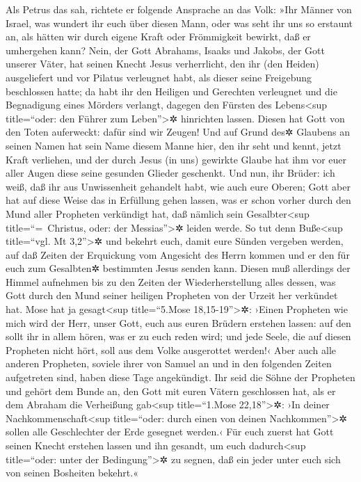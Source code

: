  Als Petrus das sah, richtete er folgende Ansprache an
das Volk: »Ihr Männer von Israel, was wundert ihr euch über diesen Mann,
oder was seht ihr uns so erstaunt an, als hätten wir durch eigene Kraft
oder Frömmigkeit bewirkt, daß er umhergehen kann?  Nein,
der Gott Abrahams, Isaaks und Jakobs, der Gott unserer Väter, hat seinen
Knecht Jesus verherrlicht, den ihr (den Heiden) ausgeliefert und vor
Pilatus verleugnet habt, als dieser seine Freigebung beschlossen hatte;
 da habt ihr den Heiligen und Gerechten verleugnet und
die Begnadigung eines Mörders verlangt,  dagegen den
Fürsten des Lebens\textless sup title=``oder: den Führer zum
Leben''\textgreater✲ hinrichten lassen. Diesen hat Gott von den Toten
auferweckt: dafür sind wir Zeugen!  Und auf Grund des✲
Glaubens an seinen Namen hat sein Name diesem Manne hier, den ihr seht
und kennt, jetzt Kraft verliehen, und der durch Jesus (in uns) gewirkte
Glaube hat ihm vor euer aller Augen diese seine gesunden Glieder
geschenkt.  Und nun, ihr Brüder: ich weiß, daß ihr aus
Unwissenheit gehandelt habt, wie auch eure Oberen;  Gott
aber hat auf diese Weise das in Erfüllung gehen lassen, was er schon
vorher durch den Mund aller Propheten verkündigt hat, daß nämlich sein
Gesalbter\textless sup title=``=~Christus, oder: der
Messias''\textgreater✲ leiden werde.  So tut denn
Buße\textless sup title=``vgl. Mt 3,2''\textgreater✲ und bekehrt euch,
damit eure Sünden vergeben werden,  auf daß Zeiten der
Erquickung vom Angesicht des Herrn kommen und er den für euch zum
Gesalbten✲ bestimmten Jesus senden kann.  Diesen muß
allerdings der Himmel aufnehmen bis zu den Zeiten der Wiederherstellung
alles dessen, was Gott durch den Mund seiner heiligen Propheten von der
Urzeit her verkündet hat.  Mose hat ja
gesagt\textless sup title=``5.Mose 18,15-19''\textgreater✲: ›Einen
Propheten wie mich wird der Herr, unser Gott, euch aus euren Brüdern
erstehen lassen: auf den sollt ihr in allem hören, was er zu euch reden
wird;  und jede Seele, die auf diesen Propheten nicht
hört, soll aus dem Volke ausgerottet werden!‹  Aber auch
alle anderen Propheten, soviele ihrer von Samuel an und in den folgenden
Zeiten aufgetreten sind, haben diese Tage angekündigt. 
Ihr seid die Söhne der Propheten und gehört dem Bunde an, den Gott mit
euren Vätern geschlossen hat, als er dem Abraham die Verheißung
gab\textless sup title=``1.Mose 22,18''\textgreater✲: ›In deiner
Nachkommenschaft\textless sup title=``oder: durch einen von deinen
Nachkommen''\textgreater✲ sollen alle Geschlechter der Erde gesegnet
werden.‹  Für euch zuerst hat Gott seinen Knecht erstehen
lassen und ihn gesandt, um euch dadurch\textless sup title=``oder: unter
der Bedingung''\textgreater✲ zu segnen, daß ein jeder unter euch sich
von seinen Bosheiten bekehrt.«

